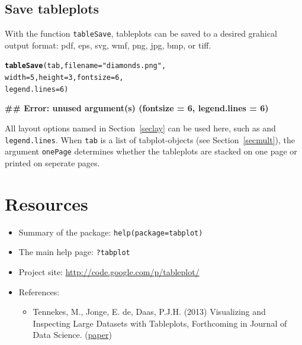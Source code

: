 \documentclass[11pt, fleqn, a4paper]{article}\usepackage{graphicx, color}
\makeatletter
\newcommand{\hlfunctioncall}[1]{\textcolor[rgb]{0.501960784313725,0,0.329411764705882}{\textbf{#1}}}%
\newcommand{\hlstring}[1]{\textcolor[rgb]{0.6,0.6,1}{#1}}%
\newenvironment{kframe}{%
 \def\at@end@of@kframe{}%
 \ifinner\ifhmode%
  \def\at@end@of@kframe{\end{minipage}}%
  \begin{minipage}{\columnwidth}%
 \fi\fi%
 \def\FrameCommand##1{\hskip\@totalleftmargin \hskip-\fboxsep
 \colorbox{shadecolor}{##1}\hskip-\fboxsep
     \hskip-\linewidth \hskip-\@totalleftmargin \hskip\columnwidth}%
 \MakeFramed {\advance\hsize-\width
   \@totalleftmargin\z@ \linewidth\hsize
   \@setminipage}}%
 {\par\unskip\endMakeFramed%
 \at@end@of@kframe}
\newenvironment{knitrout}{}{} %
\makeatother
\begin{document}
\subsection{Save tableplots}\label{secsave}

With the function {\tt tableSave}, tableplots can be saved to a desired grahical output format: pdf, eps, svg, wmf, png, jpg, bmp, or tiff.

\begin{knitrout}
\color{fgcolor}\begin{kframe}
\begin{alltt}
\hlfunctioncall{tableSave}(tab, filename = \hlstring{"diamonds.png"}, 
    width = 5, height = 3, fontsize = 6, 
    legend.lines = 6)
\end{alltt}


{\ttfamily\noindent\bfseries\textcolor{errorcolor}{\#\# Error: unused argument(s) (fontsize = 6, legend.lines = 6)}}\end{kframe}
\end{knitrout}


All layout options named in Section~\ref{seclay} can be used here, such as {\fontsize} and {\tt legend.lines}. When {\tt tab} is a list of tabplot-objects (see Section~\ref{secmult}), the argument {\tt onePage} determines whether the tableplots are stacked on one page or printed on seperate pages.

\newpage

\section*{Resources}

\begin{itemize}
\item Summary of the package: {\tt help(package=tabplot)}
\item The main help page: {\tt ?tabplot}
\item Project site: \url{http://code.google.com/p/tableplot/}
\item References:
\begin{itemize}
\item Tennekes, M., Jonge, E. de, Daas, P.J.H. (2013) Visualizing and Inspecting Large Datasets with Tableplots, Forthcoming in Journal of Data Science. (\href{http://www.jds-online.com/file_download/379/JDS-1108.pdf}{paper})
\end{itemize}
\end{itemize}
\end{document}
